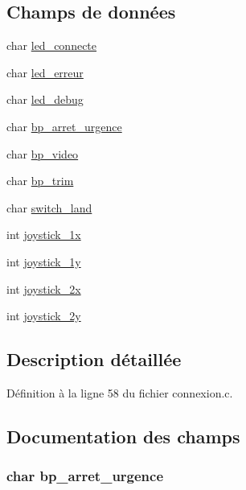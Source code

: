 \subsection*{Champs de données}
\begin{DoxyCompactItemize}
\item 
char \hyperlink{structetat__commandes_a38345f0aebb4de891510939a4d1b6d3f}{led\-\_\-connecte}
\item 
char \hyperlink{structetat__commandes_a3aaef46c6ca19a2afb10c86c5300d067}{led\-\_\-erreur}
\item 
char \hyperlink{structetat__commandes_aa6c5f40a4dec71b510d913e4c09e3cee}{led\-\_\-debug}
\item 
char \hyperlink{structetat__commandes_adcce0767b69b6aa61d9815c90afece60}{bp\-\_\-arret\-\_\-urgence}
\item 
char \hyperlink{structetat__commandes_a9f65380fb32037e5147720cbd1c20cad}{bp\-\_\-video}
\item 
char \hyperlink{structetat__commandes_adc9e1c40950878e4b174300aef5c8628}{bp\-\_\-trim}
\item 
char \hyperlink{structetat__commandes_af0fce6b96a884e05a43ec95b76d1f6db}{switch\-\_\-land}
\item 
int \hyperlink{structetat__commandes_aefd8dcb52ec6c8b5014e4e4a07ce36f5}{joystick\-\_\-1x}
\item 
int \hyperlink{structetat__commandes_a44464264b58e816437b75338c8071db7}{joystick\-\_\-1y}
\item 
int \hyperlink{structetat__commandes_ab13efe455d7039d936ed7c8909581001}{joystick\-\_\-2x}
\item 
int \hyperlink{structetat__commandes_a22286f59a64543f8e90ee521270110bd}{joystick\-\_\-2y}
\end{DoxyCompactItemize}


\subsection{Description détaillée}


Définition à la ligne 58 du fichier connexion.\-c.



\subsection{Documentation des champs}
\hypertarget{structetat__commandes_adcce0767b69b6aa61d9815c90afece60}{
\subsubsection[{bp\-\_\-arret\-\_\-urgence}]{\setlength{\rightskip}{0pt plus 5cm}char bp\-\_\-arret\-\_\-urgence}}\label{structetat__commandes_adcce0767b69b6aa61d9815c90afece60}


